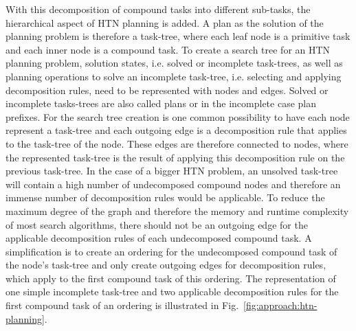 With this decomposition of compound tasks into different sub-tasks, the hierarchical aspect of HTN planning is added.
A plan as the solution of the planning problem is therefore a task-tree, where each leaf node is a primitive task and each inner node is a compound task.
To create a search tree for an HTN planning problem, solution states, i.e. solved or incomplete task-trees, as well as planning operations to solve an incomplete task-tree, i.e. selecting and applying decomposition rules, need to be represented with nodes and edges.
Solved or incomplete tasks-trees are also called plans or in the incomplete case plan prefixes.\newline
For the search tree creation is one common possibility to have each node represent a task-tree and each outgoing edge is a decomposition rule that applies to the task-tree of the node.
These edges are therefore connected to nodes, where the represented task-tree is the result of applying this decomposition rule on the previous task-tree.
In the case of a bigger HTN problem, an unsolved task-tree will contain a high number of undecomposed compound nodes and therefore an immense number of decomposition rules would be applicable.
To reduce the maximum degree of the graph and therefore the memory and runtime complexity of most search algorithms, there should not be an outgoing edge for the applicable decomposition rules of each undecomposed compound task.
A simplification is to create an ordering for the undecomposed compound task of the node's task-tree and only create outgoing edges for decomposition rules, which apply to the first compound task of this ordering.
The representation of one simple incomplete task-tree and two applicable decomposition rules for the first compound task of an ordering is illustrated in Fig.~\ref{fig:approach:htn-planning}.
